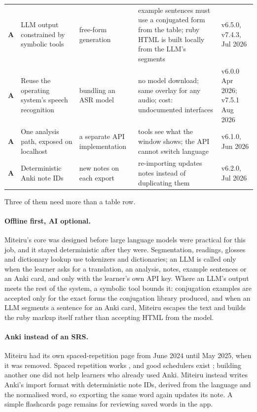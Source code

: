 ﻿\documentclass[11pt,a4paper]{article}
\begin{document}
\begin{table}[p]
\begin{tabularx}{\linewidth}{@{}p{0.3cm}P{3.1cm}P{2.6cm}YP{2.2cm}@{}}
\textcolor{withai}{\textbf{A}} & LLM output constrained by symbolic tools & free-form generation & example sentences must use a conjugated form from the table; ruby HTML is built locally from the LLM's segments & v6.5.0, v7.4.3, Jul 2026 \\
\textcolor{withai}{\textbf{A}} & Reuse the operating system's speech recognition & bundling an ASR model & no model download; same overlay for any audio; cost: undocumented interfaces & v6.0.0 Apr 2026; v7.5.1 Aug 2026 \\
\textcolor{withai}{\textbf{A}} & One analysis path, exposed on localhost & a separate API implementation & tools see what the window shows; the API cannot switch language & v6.1.0, Jun 2026 \\
\textcolor{withai}{\textbf{A}} & Deterministic Anki note IDs & new notes on each export & re-importing updates notes instead of duplicating them & v6.2.0, Jul 2026 \\
\bottomrule
\end{tabularx}
\end{table}

Three of them need more than a table row.

\paragraph{Offline first, AI optional.}
Miteiru's core was designed before large language models were practical for this job, and it stayed deterministic after they were. Segmentation, readings, glosses and dictionary lookup use tokenizers and dictionaries; an LLM is called only when the learner asks for a translation, an analysis, notes, example sentences or an Anki card, and only with the learner's own API key. Where an LLM's output meets the rest of the system, a symbolic tool bounds it: conjugation examples are accepted only for the exact forms the conjugation library produced, and when an LLM segments a sentence for an Anki card, Miteiru escapes the text and builds the ruby markup itself rather than accepting HTML from the model.

\paragraph{Anki instead of an SRS.}
Miteiru had its own spaced-repetition page from June 2024 until May 2025, when it was removed. Spaced repetition works \citep{cepeda2006distributed}, and good schedulers exist \citep{settles2016trainable,anki}; building another one did not help learners who already used Anki. Miteiru instead writes Anki's import format with deterministic note IDs, derived from the language and the normalised word, so exporting the same word again updates its note. A simple flashcards page remains for reviewing saved words in the app.
\end{document}
